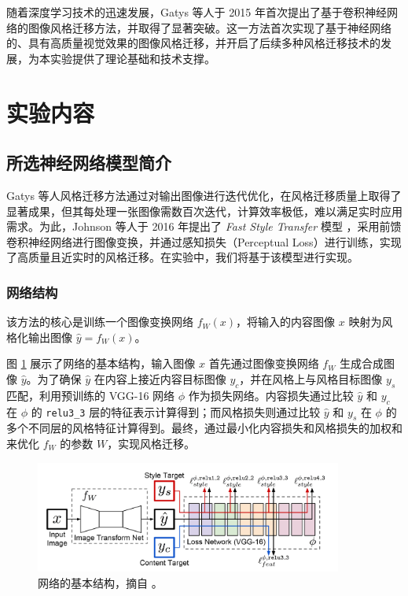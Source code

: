 \documentclass{article}
\begin{document}
随着深度学习技术的迅速发展，Gatys 等人于 2015 年首次提出了基于卷积神经网络的图像风格迁移方法\cite{gatys2015neural}，并取得了显著突破。这一方法首次实现了基于神经网络的、具有高质量视觉效果的图像风格迁移，并开启了后续多种风格迁移技术的发展，为本实验提供了理论基础和技术支撑。

\section{实验内容}

\subsection{所选神经网络模型简介}

Gatys 等人风格迁移方法\cite{gatys2015neural}通过对输出图像进行迭代优化，在风格迁移质量上取得了显著成果，但其每处理一张图像需数百次迭代，计算效率极低，难以满足实时应用需求。为此，Johnson 等人于 2016 年提出了 \emph{Fast Style Transfer} 模型 \cite{johnson2016perceptual}，采用前馈卷积神经网络进行图像变换，并通过感知损失（Perceptual Loss）进行训练，实现了高质量且近实时的风格迁移。在实验中，我们将基于该模型进行实现。

\subsubsection{网络结构}

该方法的核心是训练一个图像变换网络 $f_W(x)$，将输入的内容图像 $x$ 映射为风格化输出图像 $\hat{y} = f_W(x)$。

图 \ref{fig:network} 展示了网络的基本结构，输入图像 $x$ 首先通过图像变换网络 $f_W$ 生成合成图像 $\hat{y}$。为了确保 $\hat{y}$ 在内容上接近内容目标图像 $y_c$，并在风格上与风格目标图像 $y_s$ 匹配，利用预训练的 VGG-16 网络 \cite{simonyan2014very} $\phi$ 作为损失网络。内容损失通过比较 $\hat{y}$ 和 $y_c$ 在 $\phi$ 的 \texttt{relu3\_3} 层的特征表示计算得到；而风格损失则通过比较 $\hat{y}$ 和 $y_s$ 在 $\phi$ 的多个不同层的风格特征计算得到。最终，通过最小化内容损失和风格损失的加权和来优化 $f_W$ 的参数 $W$，实现风格迁移。

\begin{figure}[H]
\centering
\includegraphics[width=0.9\textwidth]{img/1.png}
\caption{网络的基本结构，摘自 \cite{johnson2016perceptual}。}
\label{fig:network}
\end{figure}
\end{document}
